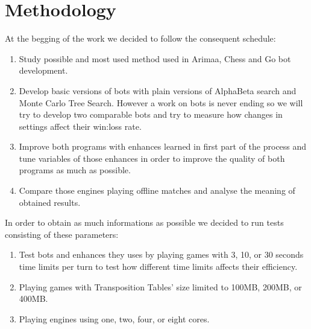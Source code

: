 \chapter{Methodology}

At the begging of the work we decided to follow the consequent schedule:

\begin{enumerate}%
\item Study possible and most used method used in Arimaa, Chess and Go bot development.
\item Develop basic versions of bots with plain versions of AlphaBeta search
and Monte Carlo Tree Search. However a work on bots is never ending so we will
try to develop two comparable bots and try to measure how changes in settings
affect their win:loss rate.
\item Improve both programs with enhances learned in first part of the process and tune variables of those enhances in order to improve the quality of both programs as much as possible.
\item Compare those engines playing offline matches and analyse the meaning of
obtained results.
\end{enumerate}

\noindent In order to obtain as much informations as possible we decided to run
tests consisting of these parameters:

\begin{enumerate}
\item Test bots and enhances they uses by playing games with 3, 10, or 30 seconds
time limits per turn to test how different time limits affects their efficiency.
\item Playing games with Transposition Tables' size limited to 100MB, 200MB, or
400MB.
\item Playing engines using one, two, four, or eight cores.
\end{enumerate}

